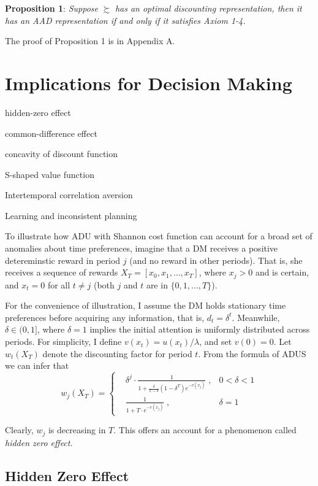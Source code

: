 \documentclass[
  12pt,
]{article}
\begin{document}
\noindent \textbf{Proposition 1}: \emph{Suppose} \(\succsim\) \emph{has
an optimal discounting representation, then it has an AAD representation
if and only if it satisfies Axiom 1-4.}

The proof of Proposition 1 is in Appendix A.

\hypertarget{implications-for-decision-making}{%
\section{Implications for Decision
Making}\label{implications-for-decision-making}}

hidden-zero effect

common-difference effect

concavity of discount function

S-shaped value function

Intertemporal correlation aversion

Learning and inconsistent planning

To illustrate how ADU with Shannon cost function can account for a broad
set of anomalies about time preferences, imagine that a DM receives a
positive detereminstic reward in period \(j\) (and no reward in other
periods). That is, she receives a sequence of rewards
\(X_T=[x_0,x_1,…,x_T]\), where \(x_j>0\) and is certain, and \(x_t = 0\)
for all \(t \neq j\) (both \(j\) and \(t\) are in \(\{0,1,...,T\}\)).

For the convenience of illustration, I assume the DM holds stationary
time preferences before acquiring any information, that is,
\(d_t=\delta^t\). Meanwhile, \(\delta\in(0,1]\), where \(\delta=1\)
implies the initial attention is uniformly distributed across periods.
For simplicity, I define \(v(x_t)=u(x_t)/\lambda\), and set \(v(0)=0\).
Let \(w_t(X_T)\) denote the discounting factor for period \(t\). From
the formula of ADUS we can infer that\[ 
w_j(X_T) = \left\{ \begin{aligned}
& \delta^j \cdot\frac{1}{1+\frac{\delta}{1-\delta}(1-\delta^T)e^{-v(x_j)}}\;, & 0<\delta<1 \\
& \frac{1}{1+T\cdot e^{-v(x_j)}}\; , & \delta=1
\end{aligned}
\right.
\]

Clearly, \(w_j\) is decreasing in \(T\). This offers an account for a
phenomenon called \emph{hidden zero effect}.

\hypertarget{hidden-zero-effect}{%
\subsection{Hidden Zero Effect}\label{hidden-zero-effect}}
\end{document}

